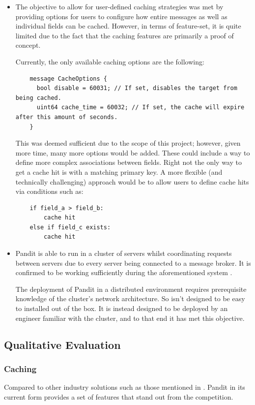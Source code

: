 \documentclass[a4paper,12pt]{report}
\begin{document}
\begin{itemize}
    \item The objective to allow for user-defined caching strategies was met by providing options for users to configure how entire messages as well as individual fields can be cached.
    However, in terms of feature-set, it is quite limited due to the fact that the caching features are primarily a proof of concept.
    
    Currently, the only available caching options are the following:
    \begin{lstlisting}
    message CacheOptions {
      bool disable = 60031; // If set, disables the target from being cached.
      uint64 cache_time = 60032; // If set, the cache will expire after this amount of seconds.
    }
    \end{lstlisting}
    This was deemed sufficient due to the scope of this project; however, given more time, many more options would be added.
    These could include a way to define more complex associations between fields. 
    Right not the only way to get a cache hit is with a matching primary key. 
    A more flexible (and technically challenging) approach would be to allow users to define cache hits via conditions such as:
    \begin{lstlisting}
    if field_a > field_b:
        cache hit
    else if field_c exists:
        cache hit
    \end{lstlisting}
    
    \item Pandit is able to run in a cluster of servers whilst coordinating requests between servers due to every server being connected to a message broker.
    It is confirmed to be working sufficiently during the aforementioned system . 
    
    The deployment of Pandit in a distributed environment requires prerequisite knowledge of the cluster's network architecture. So isn't designed to be easy to installed out of the box. 
    It is instead designed to be deployed by an engineer familiar with the cluster, and to that end it has met this objective.
    
\end{itemize}

\subsection{Qualitative Evaluation}
\label{sec:qual}
\subsubsection{Caching}
Compared to other industry solutions such as those mentioned in . Pandit in its current form provides a set of features that stand out from the competition.
\end{document}
